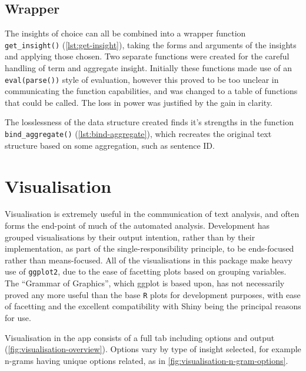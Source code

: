 \documentclass[11pt, a4paper, titlepage]{report}
\begin{document}
\subsection{Wrapper}\label{sec:wrapper}

The insights of choice can all be combined into a wrapper function
\texttt{get_insight()} (\underline{\cref{lst:get-insight}}),
taking the forms and arguments of the insights and applying those
chosen. Two separate functions were created for the careful handling
of term and aggregate insight. Initially these functions made use of
an \texttt{eval(parse())} style of evaluation, however this
proved to be too unclear in communicating the function capabilities,
and was changed to a table of functions that could be called. The loss
in power was justified by the gain in clarity.

The losslessness of the data structure created finds it's strengths in
the function \texttt{bind_aggregate()}
(\underline{\cref{lst:bind-aggregate}}), which recreates the original
text structure based on some aggregation, such as sentence ID.\

\section{Visualisation}\label{sec:visualisation}

Visualisation is extremely useful in the communication of text
analysis, and often forms the end-point of much of the automated
analysis. Development has grouped visualisations by their output
intention, rather than by their implementation, as part of the
single-responsibility principle, to be ends-focused rather than
means-focused. All of the visualisations in this package make heavy
use of \texttt{ggplot2}, due to the ease of facetting plots
based on grouping variables. The ``Grammar of Graphics'', which ggplot
is based upon, has not necessarily proved any more useful than the
base \texttt{R} plots for development purposes, with ease of facetting
and the excellent compatibility with Shiny being the principal reasons
for use.

Visualisation in the app consists of a full tab including options and
output (\underline{\cref{fig:visualisation-overview}}). Options vary
by type of insight selected, for example n-grams having unique options
related, as in \underline{\cref{fig:visualisation-n-gram-options}}.
\end{document}
